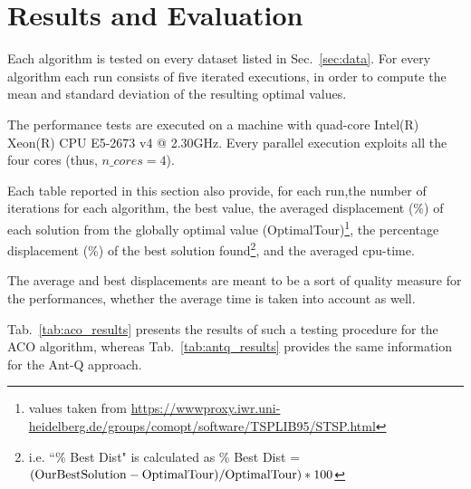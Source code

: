 \documentclass[10pt]{article}
\begin{document}
\section{Results and Evaluation}
Each algorithm is tested on every dataset listed in Sec.~\ref{sec:data}.
For every algorithm each run consists of five iterated executions, in order to compute the mean and standard deviation of the resulting optimal values. 

The performance tests are executed on a machine with quad-core Intel(R) Xeon(R) CPU E5-2673 v4 @ 2.30GHz. 
Every parallel execution exploits all the four cores (thus, $n\_cores=4$).

Each table reported in this section also provide, for each run,the number of iterations for each algorithm, the best value, the averaged displacement (\%) of each solution from the globally optimal value (OptimalTour)\footnote{values taken from \url{https://wwwproxy.iwr.uni-heidelberg.de/groups/comopt/software/TSPLIB95/STSP.html}}, the percentage displacement (\%) of the best solution found\footnote{i.e. ``\% Best Dist" is calculated as \% Best Dist = $(\rm{OurBestSolution}-\rm{OptimalTour})/\rm{OptimalTour})*100$}, and the averaged cpu-time.

The average and best displacements are meant to be a sort of quality measure for the performances, whether the average time is taken into account as well.

Tab.~\ref{tab:aco_results} presents the results of such a testing procedure for the ACO algorithm, whereas Tab.~\ref{tab:antq_results} provides the same information for the Ant-Q approach.
\end{document}
